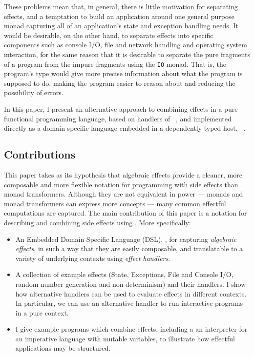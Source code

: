 \noindent
These problems mean that, in general, there is little motivation for separating
effects, and a temptation to build an application around one general purpose
monad capturing all of an application's state and exception handling needs.
%
It would be desirable, on the other hand, to separate effects into specific
components such as console I/O, file and network handling and operating system
interaction, for the same reason that it is desirable to separate the pure
fragments of a program from the impure fragments using the \texttt{IO} monad.
That is, the program's type would give more precise information about what the
program is supposed to do, making the program easier to reason about and
reducing the possibility of errors.

In this paper, I present an alternative approach to combining effects in
a pure functional programming language, based on handlers of
~\cite{Bauer}, and
implemented directly as a domain specific language embedded
in a dependently typed host, \Idris{}~\cite{Brady2013,idristutorial}.

\subsection{Contributions}

This paper takes as its hypothesis that algebraic effects provide a cleaner,
more composable and more flexible notation for programming with side effects
than monad transformers. Although they are not equivalent in power --- monads
and monad transformers can express more concepts --- many common effectful
computations are captured. 
The main contribution of this paper is a notation for describing and combining
side effects using \Idris{}. More specifically:


\begin{itemize}
\item An Embedded Domain Specific Language (DSL), \Eff{}, for capturing \emph{algebraic
effects}, in such a way that they are easily composable, and translatable to a
variety of underlying contexts using \emph{effect handlers}.
\item A collection of example effects (State, Exceptions,
File and Console I/O, random number generation and
non-determinism) and their handlers. I show how alternative handlers
can be used to evaluate effects in different contexts. In particular, we can
use an alternative handler to run interactive programs in a pure context.
\item I give example programs which combine effects, including a 
an interpreter for an imperative language with mutable variables, to
illustrate how effectful applications may be structured.
\end{itemize}

